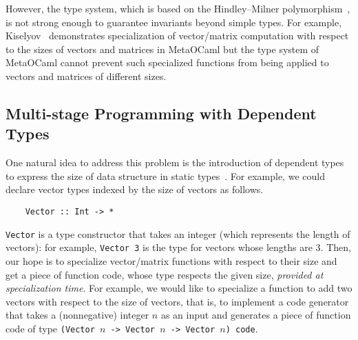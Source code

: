 
However, the type system, which is based on the Hindley--Milner
polymorphism~\cite{Milner78JCSS}, is not strong enough to guarantee
invariants beyond simple types.  For example, Kiselyov~\cite{8384206}
demonstrates specialization of vector/matrix computation with respect
to the sizes of vectors and matrices in MetaOCaml but the type system
of MetaOCaml cannot prevent such specialized functions from being applied to
vectors and matrices of different sizes.




\subsection{Multi-stage Programming with Dependent Types}


One natural idea to address this problem is the introduction of dependent types
to express the size of data structure in static types~\cite{Xi98}.
For example, we could declare vector types indexed by the size of
vectors as follows.
\begin{verbatim}
    Vector :: Int -> *
\end{verbatim}
\verb|Vector| is a type constructor that takes an integer (which
represents the length of vectors): for example, \verb|Vector 3| is the
type for vectors whose lengths are 3.  Then, our hope is to specialize
vector/matrix functions with respect to their size and get a piece of
function code, whose type respects the given size, \emph{provided at
  specialization time}.  For example, we would like to specialize a
function to add two vectors with respect to the size of vectors, that
is, to implement a code generator that takes a (nonnegative) integer $n$ as an
input and generates a piece of function code of type
\verb|(Vector |$n$\verb| -> Vector |$n$\verb| -> Vector |$n$\verb|) code|.

